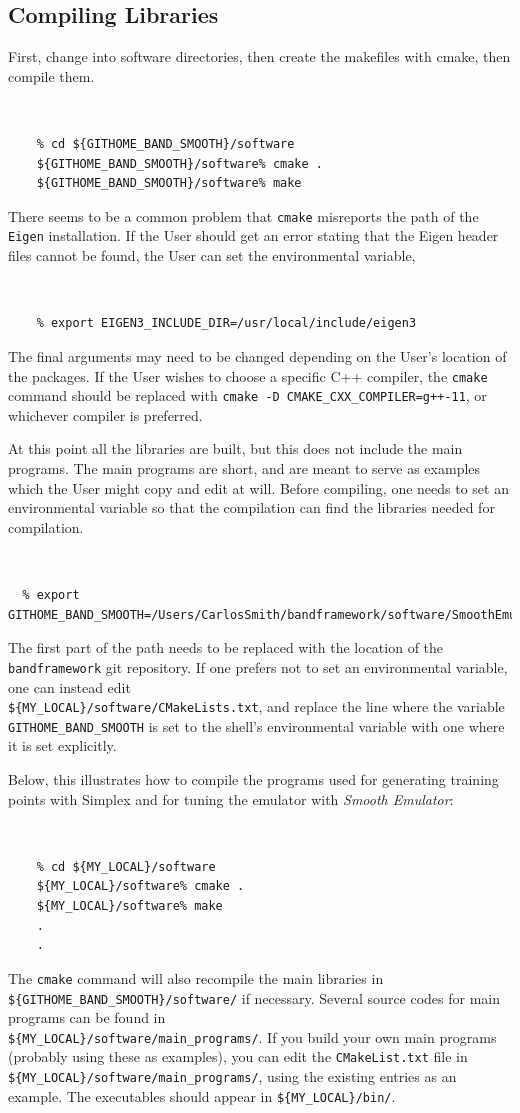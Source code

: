 \documentclass[UserManual.tex]{subfiles}
\begin{document}
\subsection{Compiling Libraries }

First, change into software directories, then create the makefiles with cmake, then compile them.
{\tt 
\begin{verbatim}
    % cd ${GITHOME_BAND_SMOOTH}/software
    ${GITHOME_BAND_SMOOTH}/software% cmake .
    ${GITHOME_BAND_SMOOTH}/software% make
\end{verbatim}
}
There seems to be a common problem that {\tt cmake} misreports the path of the {\tt Eigen} installation. If the User should get an error stating that the Eigen header files cannot be found, the User can set the environmental variable,
{\tt 
\begin{verbatim}
    % export EIGEN3_INCLUDE_DIR=/usr/local/include/eigen3
\end{verbatim}
}
The final arguments may need to be changed depending on the User's location of the packages. If the User wishes to choose a specific C++ compiler, the {\tt cmake} command should be replaced with {\tt cmake -D CMAKE\_CXX\_COMPILER=g++-11}, or whichever compiler is preferred. 

At this point all the libraries are built, but this does not include the main programs. The main programs are short, and are meant to serve as examples which the User might copy and edit at will. Before compiling, one needs to set an environmental variable so that the compilation can find the libraries needed for compilation.
{\tt
\begin{verbatim}
  % export GITHOME_BAND_SMOOTH=/Users/CarlosSmith/bandframework/software/SmoothEmulator
\end{verbatim}
}
The first part of the path needs to be replaced with the location of the {\tt bandframework} git repository. If one prefers not to set an environmental variable, one can instead edit\\
{\tt \$\{MY\_LOCAL\}/software/CMakeLists.txt}, and replace the line where the variable {\tt GITHOME\_BAND\_SMOOTH} is set to the shell's environmental variable with one where it is set explicitly.

Below, this illustrates how to compile the programs used for generating training points with Simplex and for tuning the emulator with {\it Smooth Emulator}:
{\tt
\begin{verbatim}
    % cd ${MY_LOCAL}/software
    ${MY_LOCAL}/software% cmake .
    ${MY_LOCAL}/software% make
    .
    .
\end{verbatim}
}
The {\tt cmake} command will also recompile the main libraries in {\tt \$\{GITHOME\_BAND\_SMOOTH\}/software/} if necessary. Several source codes for main programs can be found in\\
{\tt \$\{MY\_LOCAL\}/software/main\_programs/}. If you build your own main programs (probably using these as examples), you can edit the {\tt CMakeList.txt} file in {\tt \$\{MY\_LOCAL\}/software/main\_programs/}, using the existing entries as an example. The executables should appear in {\tt \$\{MY\_LOCAL\}/bin/}. 
\end{document}
